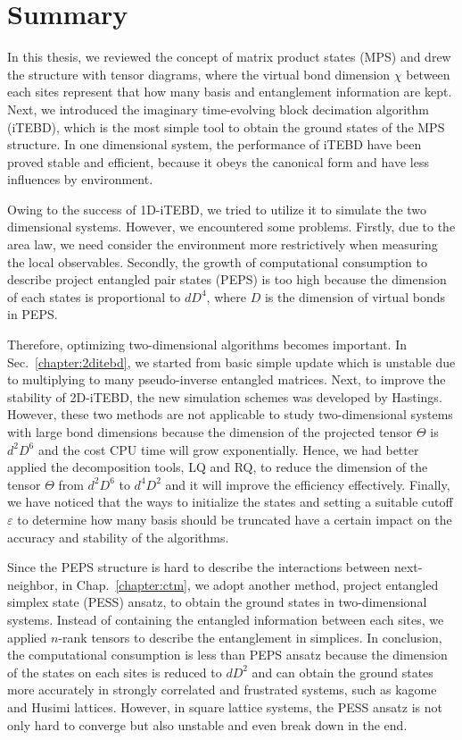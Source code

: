 \chapter{Summary}
\label{chapter:summary}

In this thesis, we reviewed the concept of matrix product states (MPS) and drew the structure with tensor diagrams, where the virtual bond dimension $\chi$ between each sites represent that how many basis and entanglement information are kept. Next, we introduced the imaginary time-evolving block decimation algorithm (iTEBD), which is the most simple tool to obtain the ground states of the MPS structure. In one dimensional system, the performance of iTEBD have been proved stable and efficient, because it obeys the canonical form and have less influences by environment. 

Owing to the success of 1D-iTEBD, we tried to utilize it to simulate the two dimensional systems. However, we encountered some problems. Firstly, due to the area law, we need consider the environment more restrictively when measuring the local observables. Secondly, the growth of computational consumption to describe project entangled pair states (PEPS) is too high because the dimension of each states is proportional to $dD^4$, where $D$ is the dimension of virtual bonds in PEPS.

Therefore, optimizing two-dimensional algorithms becomes important. In Sec.~\ref{chapter:2ditebd}, we started from basic simple update which is unstable due to multiplying to many pseudo-inverse entangled matrices. Next, to improve the stability of 2D-iTEBD, the new simulation schemes was developed by Hastings. However, these two methods are not applicable to study two-dimensional systems with large bond dimensions because the dimension of the projected tensor $\Theta$ is $d^2D^6$ and the cost CPU time will grow exponentially. Hence, we had better applied the decomposition tools, LQ and RQ, to reduce the dimension of the tensor $\Theta$ from $d^2D^6$ to $d^4D^2$ and it will improve the efficiency effectively. Finally, we have noticed that the ways to initialize the states and setting a suitable cutoff $\varepsilon$ to determine how many basis should be truncated have a certain impact on the accuracy and stability of the algorithms. 

Since the PEPS structure is hard to describe the interactions between next-neighbor, in Chap.~\ref{chapter:ctm}, we adopt another method, project entangled simplex state (PESS) ansatz, to obtain the ground states in two-dimensional systems. Instead of containing the entangled information between each sites, we applied $n$-rank tensors to describe the entanglement in simplices. In conclusion, the computational consumption is less than PEPS ansatz because the dimension of the states on each sites is reduced to $dD^2$ and can obtain the ground states more accurately in strongly correlated and frustrated systems, such as kagome and Husimi lattices. However, in square lattice systems, the PESS ansatz is not only hard to converge but also unstable and even break down in the end.


